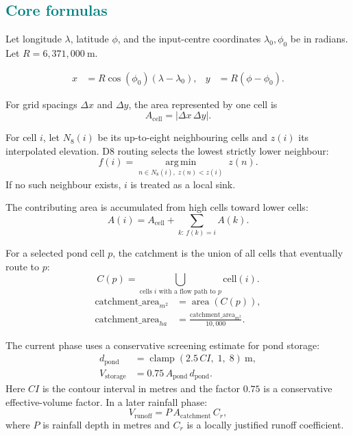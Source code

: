 \documentclass[11pt,a4paper]{article}
\newcommand{\reportsubsection}[1]{\subsection*{\textcolor{teal}{#1}}}
\begin{document}
\reportsubsection{Core formulas}
Let longitude \(\lambda\), latitude \(\phi\), and the input-centre coordinates \(\lambda_0,\phi_0\) be in radians. Let \(R=6{,}371{,}000\ \mathrm{m}\).

\begin{align}
x &= R\cos(\phi_0)(\lambda-\lambda_0), &
y &= R(\phi-\phi_0). \label{eq:projection}
\end{align}

For grid spacings \(\Delta x\) and \(\Delta y\), the area represented by one cell is
\begin{equation}
A_{\mathrm{cell}} = \left|\Delta x\,\Delta y\right|. \label{eq:cell}
\end{equation}

For cell \(i\), let \(N_8(i)\) be its up-to-eight neighbouring cells and \(z(i)\) its interpolated elevation. D8 routing selects the lowest strictly lower neighbour:
\begin{equation}
f(i) = \underset{n\in N_8(i),\;z(n)<z(i)}{\operatorname{arg\,min}}\;z(n). \label{eq:d8}
\end{equation}
If no such neighbour exists, \(i\) is treated as a local sink.

The contributing area is accumulated from high cells toward lower cells:
\begin{equation}
A(i) = A_{\mathrm{cell}} + \sum_{k:\,f(k)=i} A(k). \label{eq:accumulation}
\end{equation}

For a selected pond cell \(p\), the catchment is the union of all cells that eventually route to \(p\):
\begin{equation}
C(p)=\bigcup_{\text{cells }i\text{ with a flow path to }p} \mathrm{cell}(i). \label{eq:catchment}
\end{equation}
\begin{align}
\mathrm{catchment\_area}_{m^2} &= \operatorname{area}(C(p)),\\
\mathrm{catchment\_area}_{ha} &= \frac{\mathrm{catchment\_area}_{m^2}}{10{,}000}. \label{eq:hectares}
\end{align}

The current phase uses a conservative screening estimate for pond storage:
\begin{align}
d_{\mathrm{pond}} &= \operatorname{clamp}(2.5\,CI,\;1,\;8)\ \mathrm{m},\\
V_{\mathrm{storage}} &= 0.75\,A_{\mathrm{pond}}\,d_{\mathrm{pond}}. \label{eq:storage}
\end{align}
Here \(CI\) is the contour interval in metres and the factor \(0.75\) is a conservative effective-volume factor. In a later rainfall phase:
\begin{equation}
V_{\mathrm{runoff}}=P\,A_{\mathrm{catchment}}\,C_r, \label{eq:runoff}
\end{equation}
where \(P\) is rainfall depth in metres and \(C_r\) is a locally justified runoff coefficient.
\end{document}
